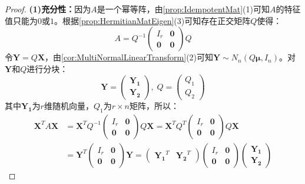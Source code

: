 \begin{proof}
	\textbf{(1)充分性：}因为$A$是一个幂等阵，由\cref{prop:IdempotentMat}(1)可知$A$的特征值只能为$0$或$1$。根据\cref{prop:HermitianMatEigen}(3)可知存在正交矩阵$Q$使得：
	\begin{equation*}
		A=Q^{-1}
		\begin{pmatrix}
			I_r & \mathbf{0} \\
			\mathbf{0} & \mathbf{0}
		\end{pmatrix}Q
	\end{equation*}
	令$\mathbf{Y}=Q\mathbf{X}$，由\cref{cor:MultiNormalLinearTransform}(2)可知$\mathbf{Y}\sim N_n(Q\boldsymbol{\mu},I_n)$。对$\mathbf{Y}$和$Q$进行分块：
	\begin{equation*}
		\mathbf{Y}=
		\begin{pmatrix}
			\mathbf{Y_1} \\
			\mathbf{Y_2}
		\end{pmatrix},\;
		Q=
		\begin{pmatrix}
			Q_1 \\
			Q_2
		\end{pmatrix}
	\end{equation*}
	其中$\mathbf{Y_1}$为$r$维随机向量，$Q_1$为$r\times n$矩阵，所以：
	\begin{align*}
		\mathbf{X}^TA\mathbf{X}&=\mathbf{X}^TQ^{-1}
		\begin{pmatrix}
			I_r & \mathbf{0} \\
			\mathbf{0} & \mathbf{0}
		\end{pmatrix}Q\mathbf{X}=\mathbf{X}^TQ^T
		\begin{pmatrix}
			I_r & \mathbf{0} \\
			\mathbf{0} & \mathbf{0}
		\end{pmatrix}Q\mathbf{X} \\
		&=\mathbf{Y}^T
		\begin{pmatrix}
			I_r & \mathbf{0} \\
			\mathbf{0} & \mathbf{0}
		\end{pmatrix}\mathbf{Y}
		=
		\begin{pmatrix}
			\mathbf{Y_1}^T & \mathbf{Y_2}^T
		\end{pmatrix}
		\begin{pmatrix}
			I_r & \mathbf{0} \\
			\mathbf{0} & \mathbf{0}
		\end{pmatrix}
		\begin{pmatrix}
			\mathbf{Y_1} \\
			\mathbf{Y_2}
		\end{pmatrix}

\end{align*}
\end{proof}
